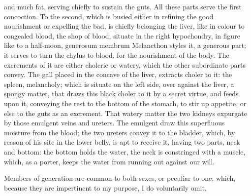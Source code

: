 {and much fat, serving chiefly to sustain the guts. All these parts
serve the first concoction. To the second, which is busied either in
refining the good nourishment or expelling the bad, is chiefly
belonging the liver, like in colour to congealed blood, the shop of
blood, situate in the right hypochondry, in figure like to a half-moon,
generosum membrum Melancthon styles it, a generous part; it serves to
turn the chylus to blood, for the nourishment of the body. The
excrements of it are either choleric or watery, which the other
subordinate parts convey. The gall placed in the concave of the liver,
extracts choler to it: the spleen, melancholy; which is situate on the
left side, over against the liver, a spongy matter, that draws this
black choler to it by a secret virtue, and feeds upon it, conveying the
rest to the bottom of the stomach, to stir up appetite, or else to the
guts as an excrement. That watery matter the two kidneys expurgate by
those emulgent veins and ureters. The emulgent draw this superfluous
moisture from the blood; the two ureters convey it to the bladder,
which, by reason of his site in the lower belly, is apt to receive it,
having two parts, neck and bottom: the bottom holds the water, the neck
is constringed with a muscle, which, as a porter, keeps the water from
running out against our will.

Members of generation are common to both sexes, or peculiar to one;
which, because they are impertinent to my purpose, I do voluntarily
omit.

}

